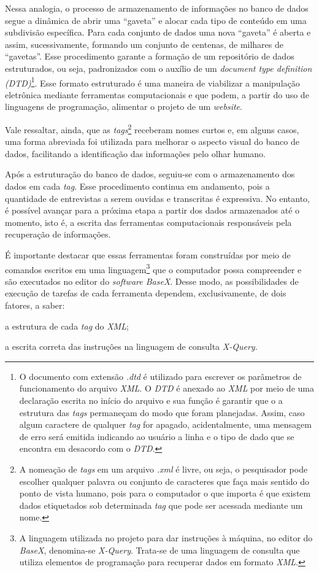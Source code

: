 \documentclass[portuguese]{textolivre}
\begin{document}
Nessa analogia, o processo de armazenamento de informações no banco de dados segue a dinâmica de abrir uma “gaveta” e alocar cada tipo de conteúdo em uma subdivisão específica. Para cada conjunto de dados uma nova “gaveta” é aberta e assim, sucessivamente, formando um conjunto de centenas, de milhares de “gavetas”. Esse procedimento garante a formação de um repositório de dados estruturados, ou seja, padronizados com o auxílio de um \emph{document type definition (DTD)}\footnote{O documento com extensão \emph{.dtd} é utilizado para escrever os parâmetros de funcionamento do arquivo \emph{XML}. O \emph{DTD} é anexado ao \emph{XML} por meio de uma declaração escrita no início do arquivo e sua função é garantir que o a estrutura das \emph{tags} permaneçam do modo que foram planejadas. Assim, caso algum caractere de qualquer \emph{tag} for apagado, acidentalmente, uma mensagem de erro será emitida indicando ao usuário a linha e o tipo de dado que se encontra em desacordo com o \emph{DTD}.}. Esse formato estruturado é uma maneira de viabilizar a manipulação eletrônica mediante ferramentas computacionais e que podem, a partir do uso de linguagens de programação, alimentar o projeto de um \emph{website}.

Vale ressaltar, ainda, que as \emph{tags}\footnote{A nomeação de \emph{tags} em um arquivo \emph{.xml} é livre, ou seja, o pesquisador pode escolher qualquer palavra ou conjunto de caracteres que faça mais sentido do ponto de vista humano, pois para o computador o que importa é que existem dados etiquetados sob determinada \emph{tag} que pode ser acessada mediante um nome.} receberam nomes curtos e, em alguns casos, uma forma abreviada foi utilizada para melhorar o aspecto visual do banco de dados, facilitando a identificação das informações pelo olhar humano.

Após a estruturação do banco de dados, seguiu-se com o armazenamento dos dados em cada \emph{tag}. Esse procedimento continua em andamento, pois a quantidade de entrevistas a serem ouvidas e transcritas é expressiva. No entanto, é possível avançar para a próxima etapa a partir dos dados armazenados até o momento, isto é, a escrita das ferramentas computacionais responsáveis pela recuperação de informações.

É importante destacar que essas ferramentas foram construídas por meio de comandos escritos em uma linguagem\footnote{A linguagem utilizada no projeto para dar instruções à máquina, no editor do \emph{BaseX}, denomina-se \emph{X-Query}. Trata-se de uma linguagem de consulta que utiliza elementos de programação para recuperar dados em formato \emph{XML}.} que o computador possa compreender e são executados no editor do \emph{software BaseX}. Desse modo, as possibilidades de execução de tarefas de cada ferramenta dependem, exclusivamente, de dois fatores, a saber: 
\begin{enumerate*}[label=\roman*)]
\item a estrutura de cada \mkbibemph{tag} do \emph{XML}; 
\item a escrita correta das instruções na linguagem de consulta \emph{X-Query}.
\end{enumerate*}
\end{document}
